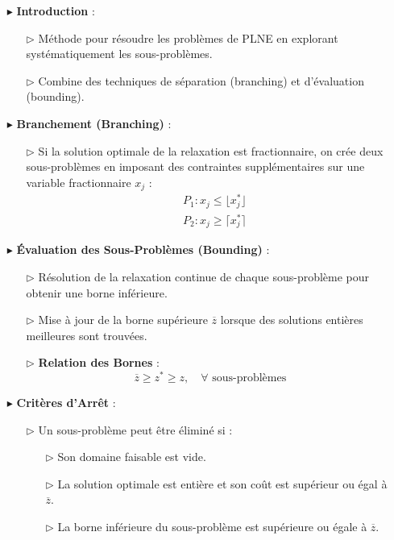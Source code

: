 \documentclass{report}
\begin{document}
\begin{multicols*}{2}
\begin{itemize}
    \item[$\blacktriangleright$] \textbf{Introduction} :
    \begin{itemize}
        \item[$\rhd$] Méthode pour résoudre les problèmes de PLNE en explorant systématiquement les sous-problèmes.
        \item[$\rhd$] Combine des techniques de séparation (branching) et d'évaluation (bounding).
    \end{itemize}

    \item[$\blacktriangleright$] \textbf{Branchement (Branching)} :
    \begin{itemize}
        \item[$\rhd$] Si la solution optimale de la relaxation est fractionnaire, on crée deux sous-problèmes en imposant des contraintes supplémentaires sur une variable fractionnaire \( x_j \) :
        \[
        \begin{aligned}
            & P_1 : x_j \leq \lfloor x_j^* \rfloor \\
            & P_2 : x_j \geq \lceil x_j^* \rceil
        \end{aligned}
        \]
    \end{itemize}

    \item[$\blacktriangleright$] \textbf{Évaluation des Sous-Problèmes (Bounding)} :
    \begin{itemize}
        \item[$\rhd$] Résolution de la relaxation continue de chaque sous-problème pour obtenir une borne inférieure.
        \item[$\rhd$] Mise à jour de la borne supérieure \( \overline{z} \) lorsque des solutions entières meilleures sont trouvées.
        \item[$\rhd$] \textbf{Relation des Bornes} :
        \[
        \overline{z} \geq z^* \geq z, \quad \forall \text{ sous-problèmes}
        \]
    \end{itemize}

    \item[$\blacktriangleright$] \textbf{Critères d'Arrêt} :
    \begin{itemize}
        \item[$\rhd$] Un sous-problème peut être éliminé si :
        \begin{itemize}
            \item[$\rhd$] Son domaine faisable est vide.
            \item[$\rhd$] La solution optimale est entière et son coût est supérieur ou égal à \( \overline{z} \).
            \item[$\rhd$] La borne inférieure du sous-problème est supérieure ou égale à \( \overline{z} \).
        \end{itemize}
    \end{itemize}


\end{itemize}
\end{multicols*}
\end{document}
